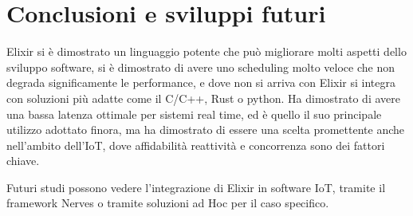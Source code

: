 \chapter*{Conclusioni e sviluppi futuri}

Elixir si è dimostrato un linguaggio potente che
può migliorare molti aspetti dello sviluppo software,
si è dimostrato di avere uno scheduling molto
veloce che non degrada significamente le performance,
e dove non si arriva con Elixir si integra con 
soluzioni più adatte come il C/C++, Rust o python.
Ha dimostrato di avere una bassa latenza ottimale per
sistemi real time, ed è quello il suo principale utilizzo
adottato finora, ma ha dimostrato di essere una scelta promettente
anche nell'ambito dell'IoT, dove affidabilità reattività 
e concorrenza sono dei fattori chiave.

Futuri studi possono vedere l'integrazione di Elixir
in software IoT, tramite il framework Nerves o tramite
soluzioni ad Hoc per il caso specifico.